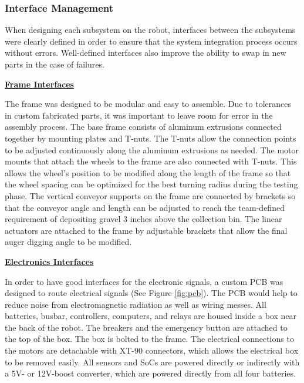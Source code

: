 \documentclass[class=article, crop=false]{standalone}
\begin{document}
	\subsubsection{Interface Management}
	When designing each subsystem on the robot, interfaces between the subsystems were clearly defined in order to ensure that the system integration process occurs without errors. Well-defined interfaces also improve the ability to swap in new parts in the case of failures.
	
	\vspace*{0.1in}
	\noindent\textbf{\underline{Frame Interfaces}}
	
	The frame was designed to be modular and easy to assemble. Due to tolerances in custom fabricated parts, it was important to leave room for error in the assembly process. The base frame consists of aluminum extrusions connected together by mounting plates and T-nuts. The T-nuts allow the connection points to be adjusted continuously along the aluminum extrusions as needed. The motor mounts that attach the wheels to the frame are also connected with T-nuts. This allows the wheel’s position to be modified along the length of the frame so that the wheel spacing can be optimized for the best turning radius during the testing phase. The vertical conveyor supports on the frame are connected by brackets so that the conveyor angle and length can be adjusted to reach the team-defined requirement of depositing gravel 3 inches above the collection bin. The linear actuators are attached to the frame by adjustable brackets that allow the final auger digging angle to be modified. 
	
	\vspace*{0.1in}
	\noindent\textbf{\underline{Electronics Interfaces}}
	
	In order to have good interfaces for the electronic signals, a custom PCB was designed to route electrical signals (See Figure \ref{fig:pcb}). The PCB would help to reduce noise from electromagnetic radiation as well as wiring messes. All batteries, busbar, controllers, computers, and relays are housed inside a box near the back of the robot. The breakers and the emergency button are attached to the top of the box. The box is bolted to the frame. The electrical connections to the motors are detachable with XT-90 connectors, which allows the electrical box to be removed easily. All sensors and SoCs are powered directly or indirectly with a 5V- or 12V-boost converter, which are powered directly from all four batteries.
\end{document}
